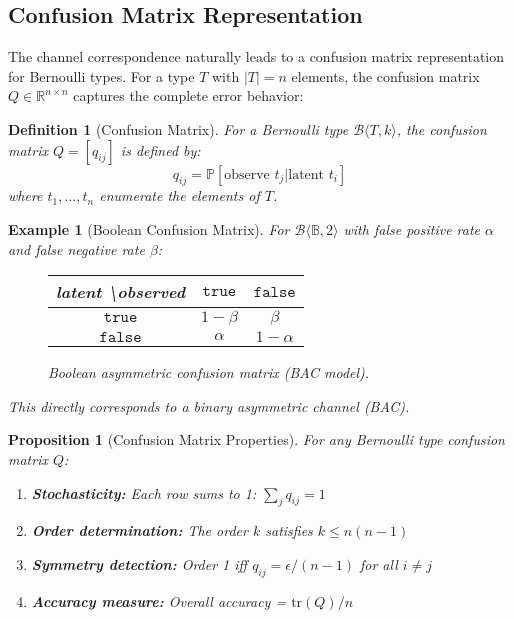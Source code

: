 \documentclass[11pt,final,hidelinks]{article}
\newtheorem{proposition}[theorem]{Proposition}
\newtheorem{definition}[theorem]{Definition}
\newtheorem{example}[theorem]{Example}
\newcommand{\bernoulli}[2]{\mathcal{B}\langle #1, #2 \rangle}
\newcommand{\Bool}{\mathbb{B}}
\newcommand{\Prob}[1]{\mathbb{P}\left[#1\right]}
\begin{document}


\subsection{Confusion Matrix Representation}

The channel correspondence naturally leads to a confusion matrix representation for Bernoulli types. For a type $T$ with $|T| = n$ elements, the confusion matrix $Q \in \mathbb{R}^{n \times n}$ captures the complete error behavior:

\begin{definition}[Confusion Matrix]
For a Bernoulli type $\bernoulli{T}{k}$, the confusion matrix $Q = [q_{ij}]$ is defined by:
\begin{equation}
q_{ij} = \Prob{\text{observe } t_j | \text{latent } t_i}
\end{equation}
where $t_1, \ldots, t_n$ enumerate the elements of $T$.
\end{definition}

\begin{example}[Boolean Confusion Matrix]
For $\bernoulli{\Bool}{2}$ with false positive rate $\alpha$ and false negative rate $\beta$:
\begin{figure}[h]
\centering
\begin{tabular}{c|cc}
latent \textbackslash observed & $\mathtt{true}$ & $\mathtt{false}$ \\
\hline
$\mathtt{true}$ & $1-\beta$ & $\beta$ \\
$\mathtt{false}$ & $\alpha$ & $1-\alpha$
\end{tabular}
\caption{Boolean asymmetric confusion matrix (BAC model).}
\end{figure}
This directly corresponds to a binary asymmetric channel (BAC).
\end{example}

\begin{proposition}[Confusion Matrix Properties]
For any Bernoulli type confusion matrix $Q$:
\begin{enumerate}
    \item \textbf{Stochasticity:} Each row sums to 1: $\sum_j q_{ij} = 1$
    \item \textbf{Order determination:} The order $k$ satisfies $k \leq n(n-1)$
    \item \textbf{Symmetry detection:} Order 1 iff $q_{ij} = \epsilon/(n-1)$ for all $i \neq j$
    \item \textbf{Accuracy measure:} Overall accuracy = $\text{tr}(Q)/n$
\end{enumerate}
\end{proposition}
\end{document}
